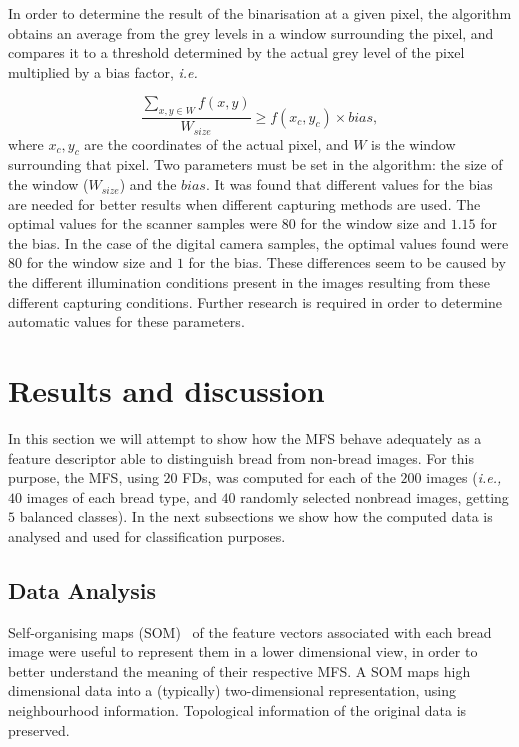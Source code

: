 \documentclass[twocolumn]{bmcart}%
\begin{document}
In order to determine the result of the binarisation at a given pixel, the algorithm obtains an average from the grey levels in a window surrounding the pixel, and compares it to a threshold determined by the actual grey level of the pixel multiplied by a bias factor, {\em i.e.}

\begin{equation}
\frac{\sum_{x,y \in W} f(x,y) }{W_{size}} \geq f(x_{c},y_{c}) \times bias,
\label{eqn:white}
\end{equation}
where $x_{c},y_{c}$ are the coordinates of the actual pixel, and $W$ is the window surrounding that pixel. Two parameters must be set in the algorithm: the size of the window ($W_{size}$) and the $bias$. It was found that different values for the bias are needed for better results when different capturing methods are used. The optimal values for the scanner samples were $80$ for the window size and $1.15$ for the bias. In the case of the digital camera samples, the optimal values found were $80$ for the window size and $1$ for the bias. These differences seem to be caused by the different illumination conditions present in the images resulting from these different capturing conditions. Further research is required in order to determine automatic values for these parameters.

\section{Results and discussion}
\label{sec:9}

In this section we will attempt to show how the MFS behave adequately as a feature descriptor able to distinguish bread from non-bread images. For this purpose, the MFS, using $20$ FDs, was computed for each of the $200$ images ({\em i.e.,} $40$ images of each bread type, and $40$ randomly selected nonbread images, getting $5$ balanced classes). In the next subsections we show how the computed data is analysed and used for classification purposes.


\subsection{Data Analysis}
\label{sec:11}

Self-organising maps (SOM)~\cite{Kohonen2001} of the feature vectors associated with each bread image were useful to represent them in a lower dimensional view, in order to better understand the meaning of their respective MFS. A SOM maps high dimensional data into a (typically) two-dimensional representation, using neighbourhood information. Topological information of the original data is preserved.
\end{document}
